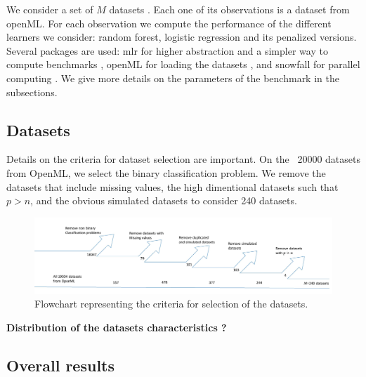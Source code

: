 \documentclass[12pt]{article}
\begin{document}
We consider a set of $M$ datasets . Each one of its observations is a dataset from openML. For each observation we compute the performance of the different learners we consider: random forest, logistic regression and its penalized versions. Several packages are used: mlr for higher abstraction and a simpler way to compute benchmarks \citep{mlrpackage}, openML for loading the datasets \citep{openMLpackage}, and snowfall for parallel computing \citep{snowfallpackage}. We give more details on the parameters of the benchmark in the subsections.

\subsection{Datasets}
Details on the criteria for dataset selection are important. On the ~20000 datasets from OpenML, we select the binary classification problem. We remove the datasets that include missing values, the high dimentional datasets such that $p>n$, and the obvious simulated datasets to consider 240 datasets.

\begin{figure}[h]
	\centerline{
		\includegraphics[width=14cm]{Schemas/FlowChart-paint.png}}
	\caption{Flowchart representing the criteria for selection of the datasets.}
	\label{fig:flowchartdataset}
\end{figure}

\textbf{Distribution of the datasets characteristics ?}

\newpage
\subsection{Overall results}
\end{document}
